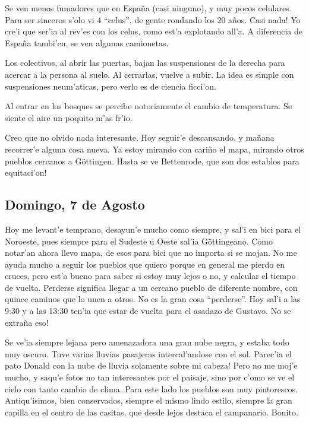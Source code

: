 Se ven menos fumadores que en Espa\~na (casi ninguno), y muy pocos celulares.
Para ser sinceros s'olo vi 4 ``celus'', de gente rondando los 20 a\~nos.
\textexclamdown Casi nada! Yo cre'i que ser'ia al rev'es con los celus, como
est'a explotando all'a. A diferencia de Espa\~na tambi'en, se ven algunas
camionetas.

Los colectivos, al abrir las puertas, bajan las suspensiones de la derecha para
acercar a la persona al suelo. Al cerrarlas, vuelve a subir. La idea es simple
con suspensiones neum'aticas, pero verlo es de ciencia ficci'on.

Al entrar en los bosques se percibe notoriamente el cambio de temperatura. Se
siente el aire un poquito m'as fr'io.

Creo que no olvido nada interesante. Hoy seguir'e descansando, y ma\~nana
recorrer'e alguna cosa nueva. Ya estoy mirando con cari\~no el mapa, mirando
otros pueblos cercanos a G\"ottingen. \textexclamdown Hasta se ve Bettenrode,
que son dos establos para equitaci'on!

\subsection*{Domingo, 7 de Agosto}

Hoy me levant'e temprano, desayun'e mucho como siempre, y sal'i en bici para el
Noroeste, pues siempre para el Sudeste u Oeste sal'ia G\"ottingeano. Como
notar'an ahora llevo mapa, de esos para bici que no importa si se mojan. No me
ayuda mucho a seguir los pueblos que quiero porque en general me pierdo en
cruces, pero est'a bueno para saber si estoy muy lejos o no, y calcular el
tiempo de vuelta. Perderse significa llegar a un cercano pueblo de diferente
nombre, con quince caminos que lo unen a otros. No es la gran cosa ``perderse''.
Hoy sal'i a las 9:30 y a las 13:30 ten'ia que estar de vuelta para el asadazo de
Gustavo. \textexclamdown No se extra\~na eso!

Se ve'ia siempre lejana pero amenazadora una gran nube negra, y estaba todo muy
oscuro. Tuve varias lluvias pasajeras intercal'andose con el sol.
\textexclamdown Parec'ia el pato Donald con la nube de lluvia solamente sobre mi
cabeza! Pero no me moj'e mucho, y saqu'e fotos no tan interesantes por el
paisaje, sino por c'omo se ve el cielo con tanto cambio de clima. Para este lado
los pueblos son muy pintorescos. Antiqu'isimos, bien conservados, siempre el
mismo lindo estilo, siempre la gran capilla en el centro de las casitas, que
desde lejos destaca el campanario. Bonito.

